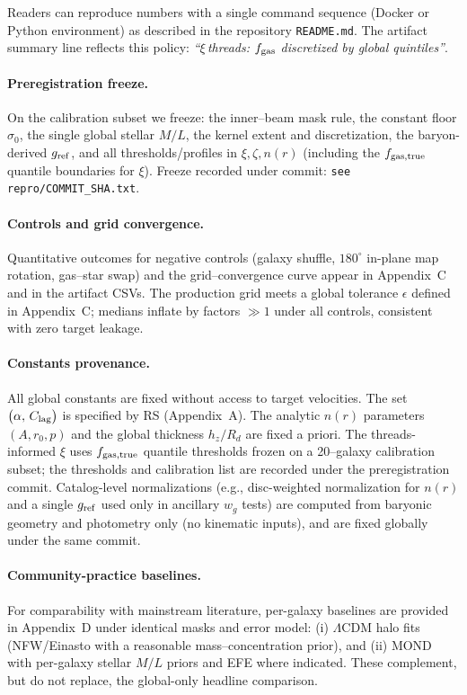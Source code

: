 \documentclass[usenatbib]{mnras}
\begin{document}
Readers can reproduce numbers with a single command sequence (Docker or Python environment) as described in the repository \texttt{README.md}. The artifact summary line reflects this policy: \emph{``$\xi$\,threads: $f_{\rm gas}$ discretized by global quintiles''}.
\paragraph{Preregistration freeze.} On the calibration subset we freeze: the inner–beam mask rule, the constant floor $\sigma_0$, the single global stellar $M/L$, the kernel extent and discretization, the baryon-derived $g_{\rm ref}$, and all thresholds/profiles in $\xi,\zeta,n(r)$ (including the $f_{\rm gas,true}$ quantile boundaries for $\xi$). Freeze recorded under commit: \texttt{see repro/COMMIT\_SHA.txt}.

\paragraph{Controls and grid convergence.} Quantitative outcomes for negative controls (galaxy shuffle, $180^\circ$ in-plane map rotation, gas–star swap) and the grid–convergence curve appear in Appendix~C and in the artifact CSVs. The production grid meets a global tolerance $\epsilon$ defined in Appendix~C; medians inflate by factors $\gg 1$ under all controls, consistent with zero target leakage.
\paragraph{Constants provenance.} All global constants are fixed without access to target velocities. The set $\big(\alpha,\,C_{\rm lag}\big)$ is specified by RS (Appendix~A). The analytic $n(r)$ parameters $(A,r_0,p)$ and the global thickness $h_z/R_d$ are fixed a priori. The threads-informed $\xi$ uses $f_{\rm gas,true}$ quantile thresholds frozen on a 20–galaxy calibration subset; the thresholds and calibration list are recorded under the preregistration commit. Catalog-level normalizations (e.g., disc-weighted normalization for $n(r)$ and a single $g_{\rm ref}$ used only in ancillary $w_g$ tests) are computed from baryonic geometry and photometry only (no kinematic inputs), and are fixed globally under the same commit.
\paragraph{Community-practice baselines.} For comparability with mainstream literature, per-galaxy baselines are provided in Appendix~D under identical masks and error model: (i) $\Lambda$CDM halo fits (NFW/Einasto with a reasonable mass–concentration prior), and (ii) MOND with per-galaxy stellar $M/L$ priors and EFE where indicated. These complement, but do not replace, the global-only headline comparison.
\end{document}
